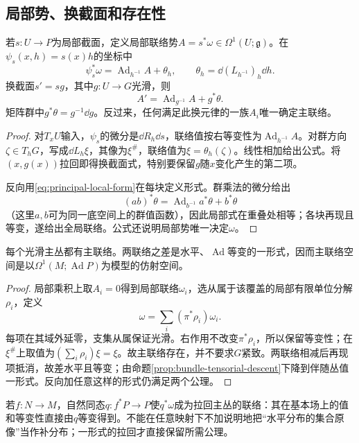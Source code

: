 \subsection{局部势、换截面和存在性}
\begin{theorem}\label{thm:principal-local-form}
若$s:U\to P$为局部截面，定义局部联络势$A=s^*\omega\in\Omega^1(U;\mathfrak g)$。在$\psi_s(x,h)=s(x)h$的坐标中
\begin{equation}\label{eq:principal-local-form}
 \psi_s^*\omega=\operatorname{Ad}_{h^{-1}}A+\theta_h,
 \qquad \theta_h=\dd(L_{h^{-1}})_h\dd h.
\end{equation}
换截面$s'=sg$，其中$g:U\to G$光滑，则
\begin{equation}\label{eq:principal-gauge-local}
 A'=\operatorname{Ad}_{g^{-1}}A+g^*\theta.
\end{equation}
矩阵群中$g^*\theta=g^{-1}\dd g$。反过来，任何满足此换元律的一族$A_i$唯一确定主联络。
\end{theorem}
\begin{proof}
对$T_xU$输入，$\psi_s$的微分是$\dd R_h\dd s$，联络值按右等变性为$\operatorname{Ad}_{h^{-1}}A$。对群方向$\zeta\in T_hG$，写成$\dd L_h\xi$，其像为$\xi^\#$，联络值为$\xi=\theta_h(\zeta)$。线性相加给出公式。将$(x,g(x))$拉回即得换截面式，特别要保留$g$随$x$变化产生的第二项。

反向用\eqref{eq:principal-local-form}在每块定义形式。群乘法的微分给出
\[
 (ab)^*\theta=\operatorname{Ad}_{b^{-1}}a^*\theta+b^*\theta
\]
（这里$a,b$可为同一底空间上的群值函数），因此局部式在重叠处相等；各块再现且等变，遂给出全局联络。公式还说明局部势唯一决定$\omega$。
\end{proof}

\begin{theorem}\label{thm:principal-existence}
每个光滑主丛都有主联络。两联络之差是水平、$\operatorname{Ad}$等变的一形式，因而主联络空间是以$\Omega^1(M;\operatorname{Ad}P)$为模型的仿射空间。
\end{theorem}
\begin{proof}
局部乘积上取$A_i=0$得到局部联络$\omega_i$，选从属于该覆盖的局部有限单位分解$\rho_i$，定义
\[
 \omega=\sum_i(\pi^*\rho_i)\omega_i.
\]
每项在其域外延零，支集从属保证光滑。右作用不改变$\pi^*\rho_i$，所以保留等变性；在$\xi^\#$上取值为$(\sum_i\rho_i)\xi=\xi$。故主联络存在，并不要求$G$紧致。两联络相减后再现项抵消，故差水平且等变；由命题\ref{prop:bundle-tensorial-descent}下降到伴随丛值一形式。反向加任意这样的形式仍满足两个公理。
\end{proof}
若$f:N\to M$，自然同态$q:f^*P\to P$使$q^*\omega$成为拉回主丛的联络：其在基本场上的值和等变性直接由$q$等变得到。不能在任意映射下不加说明地把“水平分布的集合原像”当作补分布；一形式的拉回才直接保留所需公理。

